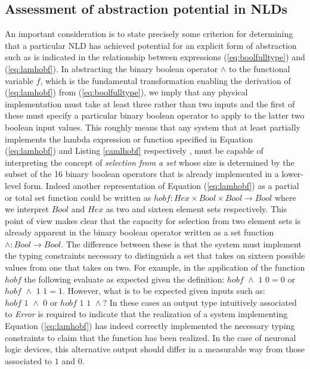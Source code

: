 \subsection{Assessment of abstraction potential in NLDs}
An important consideration is to state precisely some criterion for
determining that a particular NLD has achieved potential for an explicit
form of abstraction such as is indicated in the relationship between
expressions (\ref{eq:boolfulltype}) and
(\ref{eq:lamhobf}). In abstracting the binary boolean
operator $\wedge$ to the functional variable
$f$, which is the fundamental
transformation enabling the derivation of
(\ref{eq:lamhobf}) from
(\ref{eq:boolfulltype}), we imply that any physical
implementation must take at least three rather than two inputs and the
first of these must specify a particular binary boolean operator to
apply to the latter two boolean input values. This roughly means that
any system that at least partially implements the lambda expression or
function specified in Equation (\ref{eq:lamhobf}) and
Listing \ref{camlhobf} respectively , must be capable of
interpreting the concept of {\it selection from a set} whose size is
determined by the subset of the 16 binary boolean operators that is
already implemented in a lower-level form. Indeed another representation
of Equation (\ref{eq:lamhobf}) as a partial or total
set function could be written as $hobf : Hex \times Bool \times Bool \rightarrow Bool$
where we interpret $Bool$ and
$Hex$ as two and sixteen element sets
respectively. This point of view makes clear that the capacity for
selection from two element sets is already apparent in the binary
boolean operator written as a set function
$\wedge : Bool \rightarrow Bool$. The difference between these is
that the system must implement the typing constraints necessary to
distinguish a set that takes on sixteen possible values from one that
takes on two. For example, in the application of the function
$hobf$ the following evaluate as expected
given the definition: $hobf \,\, \wedge \,\, 1\,\, 0=0$ or
$hobf \,\, \wedge \,\, 1\,\, 1=1$. However, what is to be expected
given inputs such as: $hobf \,\, 1 \,\, \wedge\,\, 0$ or
$hobf \,\, 1 \,\, 1\,\, \wedge$? In these cases an output type
intuitively associated to {\it Error} is
required to indicate that the realization of a system implementing
Equation (\ref{eq:lamhobf}) has indeed correctly
implemented the necessary typing constraints to claim that the function
has been realized. In the case of neuronal logic devices, this
alternative output should differ in a measurable way from those
associated to $1$ and $0$.

